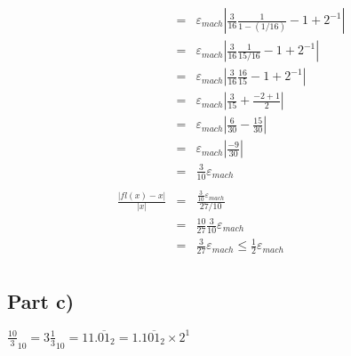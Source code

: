 \documentclass[12pt]{article}
\begin{document}
\begin{eqnarray*}
& = & \varepsilon_{mach}\left|\frac{3}{16}\frac{1}{1-(1/16)} - 1 + 2^{-1}\right|\\
& = & \varepsilon_{mach}\left|\frac{3}{16}\frac{1}{15/16} - 1 + 2^{-1}\right|\\
& = & \varepsilon_{mach}\left|\frac{3}{16}\frac{16}{15} - 1 + 2^{-1}\right|\\
& = & \varepsilon_{mach}\left|\frac{3}{15} + \frac{-2 + 1}{2}\right|\\
& = & \varepsilon_{mach}\left|\frac{6}{30} - \frac{15}{30}\right|\\
& = & \varepsilon_{mach}\left|\frac{-9}{30}\right|\\
& = & \frac{3}{10}\varepsilon_{mach}\\
\\
\frac{\left|fl(x) - x\right|}{\left|x\right|} & = & \frac{\frac{3}{10}\varepsilon_{mach}}{27/10}\\
& = & \frac{10}{27}\frac{3}{10}\varepsilon_{mach}\\
& = & \frac{3}{27}\varepsilon_{mach}\leq\frac{1}{2}\varepsilon_{mach}\\
\end{eqnarray*}

\subsection*{Part c)}
\(\frac{10}{3}_{10} = 3\frac{1}{3}_{10} = 11.\overline{01}_{2} = 1.1\overline{01}_{2}\times2^{1}\)
\end{document}
